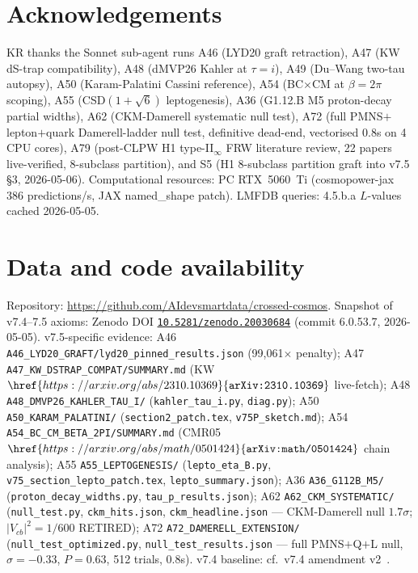 \documentclass[a4paper,11pt]{article}
\newcommand{\arXiv}[1]{\href{https://arxiv.org/abs/#1}{\texttt{arXiv:#1}}}
\newcommand{\Zeno}{\href{https://doi.org/10.5281/zenodo.20030684}{\texttt{10.5281/zenodo.20030684}}}
\theoremstyle{definition}
\theoremstyle{remark}
\begin{document}
\section*{Acknowledgements}

KR thanks the Sonnet sub-agent runs A46 (LYD20 graft retraction),
A47 (KW dS-trap compatibility), A48 (dMVP26 Kahler at $\tau=i$),
A49 (Du--Wang two-tau autopsy), A50 (Karam-Palatini Cassini
reference), A54 (BC$\times$CM at $\beta=2\pi$ scoping), A55
(CSD$(1+\sqrt 6)$ leptogenesis), A36 (G1.12.B M5
proton-decay partial widths), A62 (CKM-Damerell systematic null
test), A72 (full PMNS$+$lepton$+$quark Damerell-ladder null
test, definitive dead-end, vectorised 0.8s on 4 CPU cores),
A79 (post-CLPW H1 type-II$_\infty$ FRW literature review,
22 papers live-verified, 8-subclass partition), and
S5 (H1 8-subclass partition graft into v7.5 \S3, 2026-05-06).
Computational resources: PC RTX~5060~Ti (cosmopower-jax 386
predictions/s, JAX named\_shape patch).  LMFDB queries: 4.5.b.a
$L$-values cached 2026-05-05.

\section*{Data and code availability}

Repository: \url{https://github.com/AIdevsmartdata/crossed-cosmos}.
Snapshot of v7.4--7.5 axioms: Zenodo DOI \Zeno{} (commit
6.0.53.7, 2026-05-05).  v7.5-specific evidence:
A46 \texttt{A46\_LYD20\_GRAFT/lyd20\_pinned\_results.json}
(99,061$\times$ penalty);
A47 \texttt{A47\_KW\_DSTRAP\_COMPAT/SUMMARY.md}
(KW $\arXiv{2310.10369}$ live-fetch);
A48 \texttt{A48\_DMVP26\_KAHLER\_TAU\_I/}
(\texttt{kahler\_tau\_i.py}, \texttt{diag.py});
A50 \texttt{A50\_KARAM\_PALATINI/}
(\texttt{section2\_patch.tex}, \texttt{v75P\_sketch.md});
A54 \texttt{A54\_BC\_CM\_BETA\_2PI/SUMMARY.md}
(CMR05 $\arXiv{math/0501424}$ chain analysis);
A55 \texttt{A55\_LEPTOGENESIS/}
(\texttt{lepto\_eta\_B.py},
\texttt{v75\_section\_lepto\_patch.tex},
\texttt{lepto\_summary.json});
A36 \texttt{A36\_G112B\_M5/}
(\texttt{proton\_decay\_widths.py},
\texttt{tau\_p\_results.json});
A62 \texttt{A62\_CKM\_SYSTEMATIC/}
(\texttt{null\_test.py}, \texttt{ckm\_hits.json},
\texttt{ckm\_headline.json} --- CKM-Damerell null $1.7\sigma$;
$|V_{cb}|^2=1/600$ RETIRED);
A72 \texttt{A72\_DAMERELL\_EXTENSION/}
(\texttt{null\_test\_optimized.py},
\texttt{null\_test\_results.json} --- full PMNS$+$Q$+$L null,
$\sigma=-0.33$, $P=0.63$, 512 trials, 0.8s).
v7.4 baseline: cf.\ v7.4 amendment v2~\cite{V74amend}.
\end{document}
